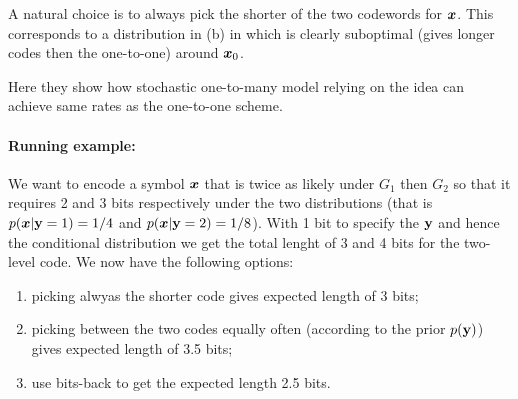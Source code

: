 A natural choice is to always pick the shorter of the two codewords for ${\bm{x}}$. This corresponds to a distribution in (b) in  which is clearly suboptimal (gives longer codes then the one-to-one) around ${\bm{x}}_0$.

\begin{notebox}
Here they show how stochastic one-to-many model relying on the  idea can achieve same rates as the one-to-one scheme.
\end{notebox}

\paragraph{Running example: } We want to encode a symbol ${\bm{x}}$ that is twice as likely under $G_1$ then $G_2$ so that it requires 2 and 3 bits respectively under the two distributions (that is $p({\bm{x}} | {\mathbf{y}} = 1) = 1/4$ and $p({\bm{x}} | {\mathbf{y}} = 2) = 1/8$).
With 1 bit to specify the ${\mathbf{y}}$ and hence the conditional distribution we get the total lenght of 3 and 4 bits for the two-level code.
We now have the following options:
\begin{enumerate}[noitemsep, topsep=0pt]
\item picking alwyas the shorter code gives expected length of 3 bits;
\item picking between the two codes equally often (according to the prior $p({\mathbf{y}})$) gives expected length of 3.5 bits;
\item use bits-back to get the expected length 2.5 bits.
\end{enumerate}

